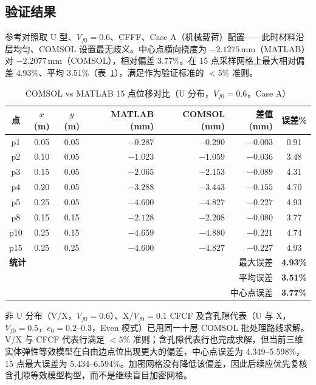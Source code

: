 \documentclass[11pt,a4paper]{ctexart}
\begin{document}
\subsection{验证结果}

参考对照取 U 型、$V_{f0}=0.6$、CFFF、Case A（机械载荷）配置——此时材料沿层均匀、COMSOL 设置最无歧义。中心点横向挠度为 $-2.1275$\,mm（MATLAB）对 $-2.2077$\,mm（COMSOL），相对偏差 3.77\%。在 15 点采样网格上最大相对偏差 4.93\%、平均 3.51\%（表~\ref{tab:15point}），满足作为验证标准的 $<5\%$ 准则。

\begin{table}[H]
\centering
\caption{COMSOL vs MATLAB 15 点位移对比（U 分布，$V_{f0}=0.6$，Case A）}
\label{tab:15point}
\small
\begin{tabular}{cccrrrc}
\toprule
\textbf{点} & $x$ (m) & $y$ (m) & \textbf{MATLAB} (mm) & \textbf{COMSOL} (mm) & \textbf{差值} (mm) & \textbf{误差\%} \\
\midrule
p1  & 0.05 & 0.05 & $-0.287$ & $-0.290$ & $-0.003$ & 0.91 \\
p2  & 0.10 & 0.05 & $-1.023$ & $-1.059$ & $-0.036$ & 3.48 \\
p3  & 0.15 & 0.05 & $-2.065$ & $-2.153$ & $-0.089$ & 4.31 \\
p4  & 0.20 & 0.05 & $-3.288$ & $-3.443$ & $-0.155$ & 4.70 \\
p5  & 0.25 & 0.05 & $-4.600$ & $-4.827$ & $-0.227$ & 4.93 \\
p8  & 0.15 & 0.15 & $-2.128$ & $-2.208$ & $-0.080$ & 3.77 \\
p10 & 0.25 & 0.15 & $-4.659$ & $-4.880$ & $-0.221$ & 4.74 \\
p15 & 0.25 & 0.25 & $-4.600$ & $-4.827$ & $-0.227$ & 4.93 \\
\midrule
\multicolumn{4}{l}{\textbf{统计}} & \multicolumn{2}{r}{最大误差} & \textbf{4.93\%} \\
\multicolumn{4}{l}{} & \multicolumn{2}{r}{平均误差} & \textbf{3.51\%} \\
\multicolumn{4}{l}{} & \multicolumn{2}{r}{中心点误差} & \textbf{3.77\%} \\
\bottomrule
\end{tabular}
\end{table}

非 U 分布（V/X，$V_{f0}=0.6$）、X/$V_{f0}=0.1$ CFCF 及含孔隙代表（U 与 X，$V_{f0}=0.5$，$e_0=0.2$--$0.3$，Even 模式）已用同一十层 COMSOL 批处理路线求解。V/X 与 CFCF 代表行满足 $<5\%$ 准则；含孔隙代表行也完成求解，但当前三维实体弹性等效模型在自由边点位出现更大的偏差，中心点误差为 4.349--5.598\%，15 点最大误差为 5.434--6.594\%。加密网格没有降低该偏差，因此后续应优先复核含孔隙等效模型构型，而不是继续盲目加密网格。
\end{document}
